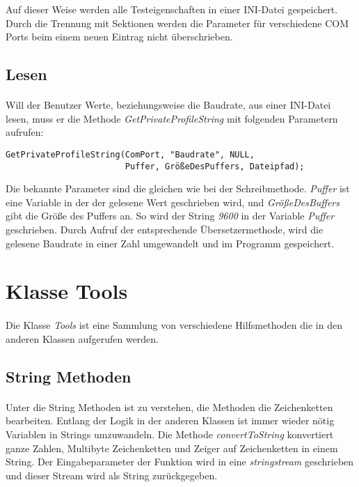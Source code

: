 Auf dieser Weise werden alle Testeigenschaften in einer INI-Datei gespeichert. Durch die Trennung mit Sektionen werden die Parameter für verschiedene COM Ports beim einem neuen Eintrag nicht überschrieben.


\subsection{Lesen}
\paragraph{}
Will der Benutzer Werte, beziehungsweise die Baudrate, aus einer INI-Datei lesen, muss er die Methode \textit{GetPrivateProfileString} mit folgenden Parametern aufrufen:\\

\begin{lstlisting}
GetPrivateProfileString(ComPort, "Baudrate", NULL,
                        Puffer, GrößeDesPuffers, Dateipfad);
\end{lstlisting}

Die bekannte Parameter sind die gleichen wie bei der Schreibmethode. \textit{Puffer} ist eine Variable in der der gelesene Wert geschrieben wird, und \textit{GrößeDesBuffers} gibt die Größe des Puffers an. So wird der String \textit{9600} in der Variable \textit{Puffer} geschrieben. Durch Aufruf der entsprechende Übersetzermethode, wird die gelesene Baudrate in einer Zahl umgewandelt und im Programm gespeichert.


\newpage


\section{Klasse Tools}
\paragraph{}
Die Klasse \textit{Tools} ist eine Sammlung von verschiedene Hilfsmethoden die in den anderen Klassen aufgerufen werden.  
\subsection{String Methoden}
\paragraph{}
Unter die String Methoden ist zu verstehen, die Methoden die Zeichenketten bearbeiten. Entlang der Logik in der anderen Klassen ist immer wieder nötig Variablen in Strings umzuwandeln. Die Methode \textit{convertToString} konvertiert ganze Zahlen, Multibyte Zeichenketten und Zeiger auf Zeichenketten in einem String. Der Eingabeparameter der Funktion wird in eine \textit{stringstream} geschrieben und dieser Stream wird als String zurückgegeben.\\

